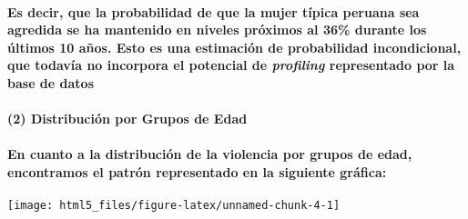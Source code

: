 \documentclass[]{article}
\let\oldparagraph\paragraph
\renewcommand{\paragraph}[1]{\oldparagraph{#1}\mbox{}}
\begin{document}
\paragraph{\texorpdfstring{Es decir, que la probabilidad de que la mujer
típica peruana sea agredida se ha mantenido en niveles próximos al 36\%
durante los últimos 10 años. Esto es una estimación de probabilidad
incondicional, que todavía no incorpora el potencial de \emph{profiling}
representado por la base de
datos}{Es decir, que la probabilidad de que la mujer típica peruana sea agredida se ha mantenido en niveles próximos al 36\% durante los últimos 10 años. Esto es una estimación de probabilidad incondicional, que todavía no incorpora el potencial de profiling representado por la base de datos}}\label{es-decir-que-la-probabilidad-de-que-la-mujer-tipica-peruana-sea-agredida-se-ha-mantenido-en-niveles-proximos-al-36-durante-los-ultimos-10-anos.-esto-es-una-estimacion-de-probabilidad-incondicional-que-todavia-no-incorpora-el-potencial-de-profiling-representado-por-la-base-de-datos}

\paragraph{(2) Distribución por Grupos de
Edad}\label{distribucion-por-grupos-de-edad}

\paragraph{En cuanto a la distribución de la violencia por grupos de
edad, encontramos el patrón representado en la siguiente
gráfica:}\label{en-cuanto-a-la-distribucion-de-la-violencia-por-grupos-de-edad-encontramos-el-patron-representado-en-la-siguiente-grafica}

\begin{center}\texttt{[image: html5\_files/figure-latex/unnamed-chunk-4-1]} \end{center}
\end{document}
